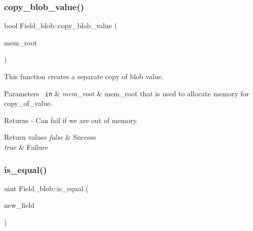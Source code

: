 \mbox{\label{classField__blob_ac822037d569ad65e04c3f938382eef0b}} 
\subsubsection{\texorpdfstring{copy\+\_\+blob\+\_\+value()}{copy\_blob\_value()}}
{\footnotesize\ttfamily bool Field\+\_\+blob\+::copy\+\_\+blob\+\_\+value (\begin{DoxyParamCaption}\item[{M\+E\+M\+\_\+\+R\+O\+OT $\ast$}]{mem\+\_\+root }\end{DoxyParamCaption})}

This function creates a separate copy of blob value.


\begin{DoxyParams}[1]{Parameters}
\mbox{\texttt{ in}}  & {\em mem\+\_\+root} & mem\+\_\+root that is used to allocate memory for \textquotesingle{}copy\+\_\+of\+\_\+value\textquotesingle{}.\\
\hline
\end{DoxyParams}
\begin{DoxyReturn}{Returns}
-\/ Can fail if we are out of memory. 
\end{DoxyReturn}

\begin{DoxyRetVals}{Return values}
{\em false} & Success \\
\hline
{\em true} & Failure \\
\hline
\end{DoxyRetVals}
\mbox{\label{classField__blob_aad2a7c5fe21d9c7cfd20aeea52c58ed5}} 
\subsubsection{\texorpdfstring{is\+\_\+equal()}{is\_equal()}}
{\footnotesize\ttfamily uint Field\+\_\+blob\+::is\+\_\+equal (\begin{DoxyParamCaption}\item[{\mbox{\hyperlink{classCreate__field}{Create\+\_\+field}} $\ast$}]{new\+\_\+field }\end{DoxyParamCaption})\hspace{0.3cm}{\ttfamily [virtual]}}


